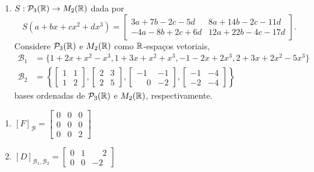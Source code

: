\documentclass[12pt]{exam}
\begin{document}
\begin{exercicio}
\begin{enumerate}[label={\alph*})]
        \item $S : \mathcal{P}_3(\mathbb{R}) \to M_2(\mathbb{R})$ dada por
        \[
        S(a + bx + cx^2 + dx^3) = \begin{bmatrix}
            3a + 7b - 2c - 5d & 8a + 14b - 2c - 11d\\
            -4a - 8b + 2c + 6d & 12a + 22b - 4c - 17d
        \end{bmatrix}.
        \]
        Considere $\mathcal{P}_3(\mathbb{R})$ e $M_2(\mathbb{R})$ como $\mathbb{R}$-espaços vetoriais,
        \begin{align*}
            \mathcal{B}_1 &= \{1 + 2x + x^2 - x^3, 1 + 3x + x^2 + x^3, -1 - 2x + 2x^3, 2 + 3x + 2x^2 - 5x^3\}\\
            \mathcal{B}_2 &= \left\{\begin{bmatrix}
                1 & 1\\1 & 2
            \end{bmatrix}, \begin{bmatrix}
                2 & 3\\2 & 5
            \end{bmatrix}, \begin{bmatrix}
                -1 & -1\\\phantom{-}0 & -2
            \end{bmatrix}, \begin{bmatrix}
                -1 & -4\\-2 & -4
            \end{bmatrix}\right\}
        \end{align*}
        bases ordenadas de $\mathcal{P}_3(\mathbb{R})$ e $M_2(\mathbb{R})$, respectivamente.
    \end{enumerate}
    \begin{solucao}
        \begin{enumerate}[label={\alph*})]
            \item $[F]_\mathcal{B} = \begin{bmatrix}
                0 & 0 & 0\\
                0 & 0 & 0\\
                0 & 0 & 2
            \end{bmatrix}$

            \item $[D]_{\mathcal{B}_1, \mathcal{B}_2} = \begin{bmatrix}
                0 & 1 & \phantom{-}2\\
                0 & 0 & -2
            \end{bmatrix}$


\end{enumerate}
\end{solucao}
\end{exercicio}
\end{document}
